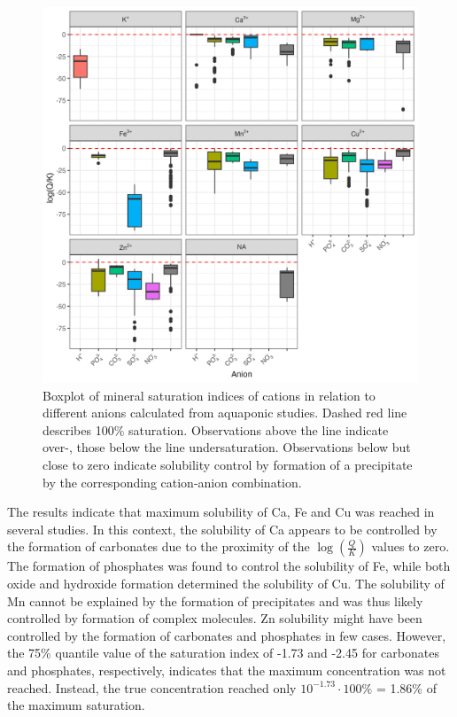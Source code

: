 \documentclass[
]{article}
\begin{document}
\begin{figure}
\centering
\includegraphics{plots/boxplot_empirical_saturation_vm.png}
\caption{Boxplot of mineral saturation indices of cations in relation to different anions calculated from aquaponic studies. Dashed red line describes 100\% saturation. Observations above the line indicate over-, those below the line undersaturation. Observations below but close to zero indicate solubility control by formation of a precipitate by the corresponding cation-anion combination.}
\end{figure}

The results indicate that maximum solubility of Ca, Fe and Cu was reached in several studies. In this context, the solubility of Ca appears to be controlled by the formation of carbonates due to the proximity of the \(\log(\frac{Q}{K})\) values to zero. The formation of phosphates was found to control the solubility of Fe, while both oxide and hydroxide formation determined the solubility of Cu. The solubility of Mn cannot be explained by the formation of precipitates and was thus likely controlled by formation of complex molecules. Zn solubility might have been controlled by the formation of carbonates and phosphates in few cases. However, the 75\% quantile value of the saturation index of -1.73 and -2.45 for carbonates and phosphates, respectively, indicates that the maximum concentration was not reached. Instead, the true concentration reached only \(10^{-1.73} \cdot 100\%\) = 1.86\% of the maximum saturation.
\end{document}
